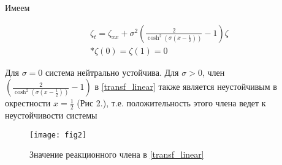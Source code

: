 Имеем 

\begin{gather} \label{transf_linear}
    \zeta_t = \zeta_{xx} + \sigma^2 \left( \frac{2}{\cosh^2(\sigma(x - \frac{1}{2}))} - 1 \right) \zeta \\* 
    \zeta(0) = \zeta(1) = 0 
\end{gather}

Для $\sigma = 0$ система нейтрально устойчива. Для $\sigma > 0$, член 
$\left(\frac{2}{\cosh^2(\sigma(x - \frac{1}{2}))} - 1 \right)$  в 
\eqref{transf_linear} также является неустойчивым в окрестности 
$x = \frac{1}{2}$ (Рис 2.), т.е. положительность этого члена ведет к
неустойчивости системы


\begin{figure}[H]
    \centering
    \texttt{[image: fig2]}
    \caption{Значение реакционного члена в \eqref{transf_linear}}
\end{figure}
